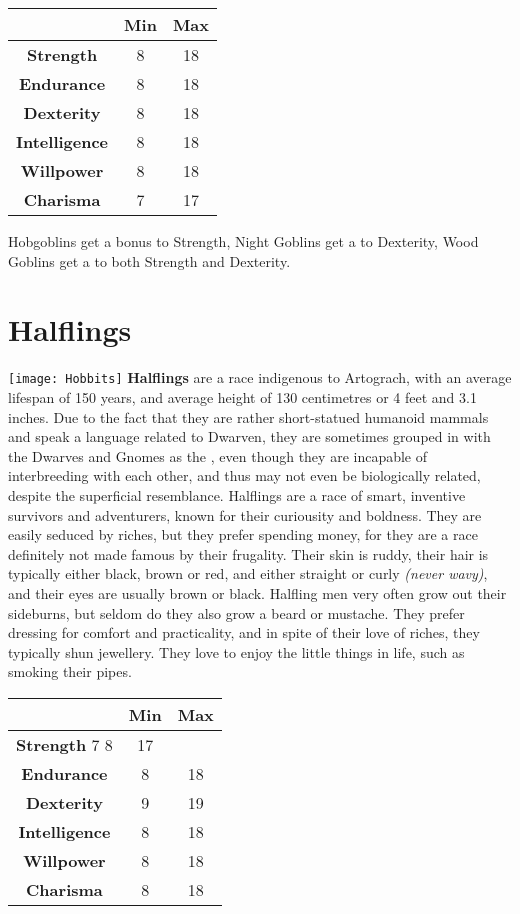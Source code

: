\documentclass[openany,10pt,a4paper]{book}
\begin{document}
\begin{tabular}{|c|c|c|}
\hline
 & \textbf{Min} & \textbf{Max} \\ \hline
\textbf{Strength} & 8 & 18 \\ \hline
\textbf{Endurance} & 8 & 18 \\ \hline
\textbf{Dexterity} & 8 & 18 \\ \hline
\textbf{Intelligence} & 8 & 18 \\ \hline
\textbf{Willpower} & 8 & 18 \\ \hline
\textbf{Charisma} & 7 & 17 \\ \hline
\end{tabular}\newline
Hobgoblins get a  bonus to Strength, Night Goblins get a  to Dexterity, Wood Goblins get a  to both Strength and Dexterity. \newpage
\section{Halflings}
\texttt{[image: Hobbits]}\newline
\textbf{Halflings} are a race indigenous to Artograch, with an average lifespan of 150 years, and average height of 130 centimetres or 4 feet and 3.1 inches. Due to the fact that they are rather short-statued humanoid mammals and speak a language related to Dwarven, they are sometimes grouped in with the Dwarves and Gnomes as the , even though they are incapable of interbreeding with each other, and thus may not even be biologically related, despite the superficial resemblance.\newline
Halflings are a race of smart, inventive survivors and adventurers, known for their curiousity and boldness. They are easily seduced by riches, but they prefer spending money, for they are a race definitely not made famous by their frugality. Their skin is ruddy, their hair is typically either black, brown or red, and either straight or curly \textit{(never wavy)}, and their eyes are usually brown or black. Halfling men very often grow out their sideburns, but seldom do they also grow a beard or mustache. They prefer dressing for comfort and practicality, and in spite of their love of riches, they typically shun jewellery. They love to enjoy the little things in life, such as smoking their pipes.\newline
\begin{tabular}{|c|c|c|}
\hline
 & \textbf{Min} & \textbf{Max} \\ \hline
\textbf{Strength} 7 8 & 17 \\ \hline
\textbf{Endurance} & 8 & 18 \\ \hline
\textbf{Dexterity} & 9 & 19 \\ \hline
\textbf{Intelligence} & 8 & 18 \\ \hline
\textbf{Willpower} & 8 & 18 \\ \hline
\textbf{Charisma} & 8 & 18 \\ \hline
\end{tabular}\newline
{} \newpage
\end{document}
